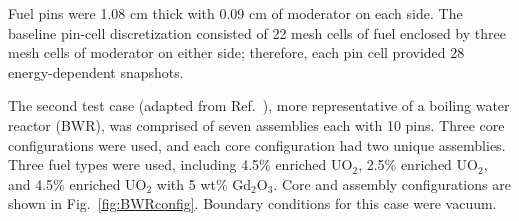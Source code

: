 \documentclass[5p,times,twocolumn,10pt]{elsarticle}
\newcommand{\REF}[1]{Ref.~\citen{#1}}               %
\begin{document}
    Fuel pins were 1.08 cm thick with 0.09 cm of moderator on each side. The
    baseline pin-cell discretization consisted of 22 mesh cells of fuel
enclosed
    by three mesh cells of moderator on either side; therefore, each pin cell
    provided 28 energy-dependent snapshots.

    The second test case (adapted from \REF{Nichita1998}), more representative
of a     boiling water
    reactor (BWR), was comprised of seven assemblies each with 10 pins.  Three
    core configurations were used, and each core configuration had two unique
    assemblies.  Three fuel types were used, including 4.5\% enriched UO$_2$,
    2.5\% enriched UO$_2$, and 4.5\% enriched UO$_2$ with 5 wt\% Gd$_2$O$_3$.
    Core and assembly configurations are shown in Fig.~\ref{fig:BWRconfig}.
    Boundary conditions for this case were vacuum.
\end{document}
